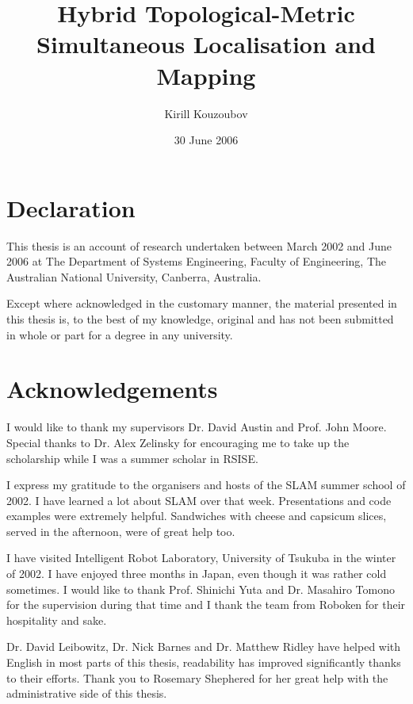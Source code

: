 \documentclass[11pt,onecolum,a4paper,oneside]{book}
\title{Hybrid Topological-Metric Simultaneous Localisation and
  Mapping}
\author{Kirill Kouzoubov}
\begin{document}
\date{30 June 2006}

\maketitle
\normalsize

\onehalfspace
\chapter*{Declaration}

This thesis is an account of research undertaken between March 2002
and June 2006 at The Department of Systems Engineering, Faculty of
Engineering, The Australian National University, Canberra, Australia.

Except where acknowledged in the customary manner, the material 
presented in this thesis is, to the best of my knowledge, original and 
has not been submitted in whole or part for a degree in any 
university.

\chapter*{Acknowledgements}

I would like to thank my supervisors Dr. David Austin and Prof. John
Moore. Special thanks to Dr. Alex Zelinsky for encouraging me to take
up the scholarship while I was a summer scholar in RSISE.

I express my gratitude to the organisers and hosts of the SLAM summer
school of 2002. I have learned a lot about SLAM over that week.
Presentations and code examples were extremely helpful.  Sandwiches
with cheese and capsicum slices, served in the afternoon, were of
great help too.

I have visited Intelligent Robot Laboratory, University of Tsukuba in
the winter of 2002. I have enjoyed three months in Japan, even though
it was rather cold sometimes. I would like to thank Prof. Shinichi
Yuta and Dr. Masahiro Tomono for the supervision during that time and
I thank the team from Roboken for their hospitality and sake.

Dr. David Leibowitz, Dr. Nick Barnes and Dr. Matthew Ridley have helped
with English in most parts of this thesis, readability has improved
significantly thanks to their efforts. Thank you to Rosemary Shephered
for her great help with the administrative side of this thesis.

\end{document}
